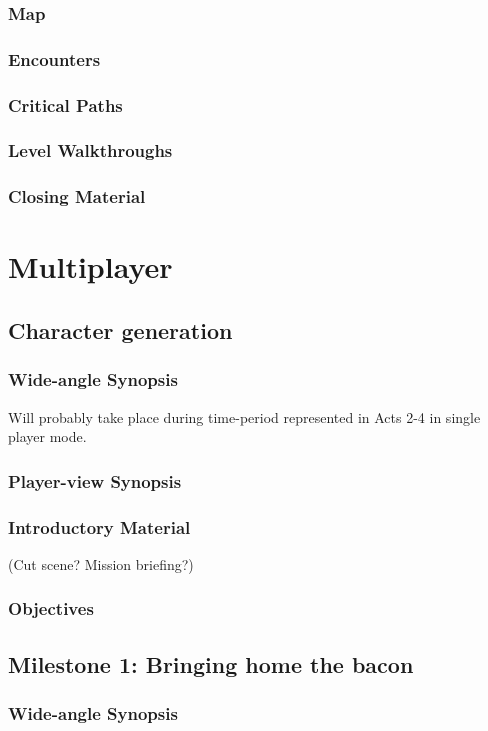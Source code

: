 \subsubsection{Map}
\subsubsection{Encounters}
\subsubsection{Critical Paths}
\subsubsection{Level Walkthroughs}
\subsubsection{Closing Material}


\section{Multiplayer}
\subsection{Character generation}
\subsubsection{Wide-angle Synopsis}
Will probably take place during time-period represented in Acts 2-4 in single player mode.
\subsubsection{Player-view Synopsis}
\subsubsection{Introductory Material}
 (Cut scene?  Mission briefing?)
\subsubsection{Objectives}

\subsection{Milestone 1: Bringing home the bacon}
\subsubsection{Wide-angle Synopsis}

